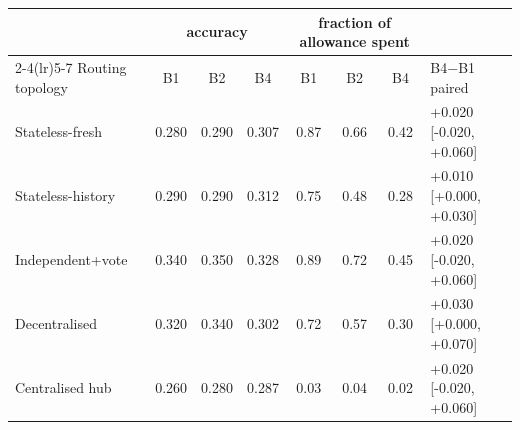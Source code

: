\begin{tabular}{lccccccl}
\toprule
& \multicolumn{3}{c}{accuracy} & \multicolumn{3}{c}{fraction of allowance spent} & \\
\cmidrule(lr){2-4}\cmidrule(lr){5-7}
Routing topology & B1 & B2 & B4 & B1 & B2 & B4 & B4$-$B1 paired \\
\midrule
Stateless-fresh & 0.280 & 0.290 & 0.307 & 0.87 & 0.66 & 0.42 & +0.020 [-0.020, +0.060] \\
Stateless-history & 0.290 & 0.290 & 0.312 & 0.75 & 0.48 & 0.28 & +0.010 [+0.000, +0.030] \\
Independent+vote & 0.340 & 0.350 & 0.328 & 0.89 & 0.72 & 0.45 & +0.020 [-0.020, +0.060] \\
Decentralised & 0.320 & 0.340 & 0.302 & 0.72 & 0.57 & 0.30 & +0.030 [+0.000, +0.070] \\
Centralised hub & 0.260 & 0.280 & 0.287 & 0.03 & 0.04 & 0.02 & +0.020 [-0.020, +0.060] \\
\bottomrule
\end{tabular}